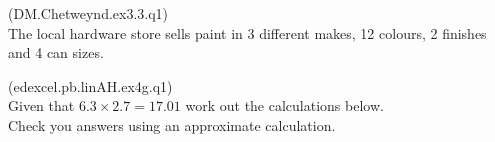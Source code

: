 \documentclass[10pt]{exam}
\newcommand{\sol}[1]{\color{gray}\fillwithlines{#1}\color{black}}
\begin{document}

\newpage 
\begin{questions}
\addpoints
\question (DM.Chetweynd.ex3.3.q1) \\
The local hardware store sells paint in 3 different makes, 12 colours, 2 finishes and 4 can sizes.

\sol{\fill}

\question (edexcel.pb.linAH.ex4g.q1) \\
Given that $6.3 \times 2.7 = 17.01$ work out the calculations below.\\
Check you answers using an approximate calculation.
\sol{\fill}


\end{questions}
\end{document}
